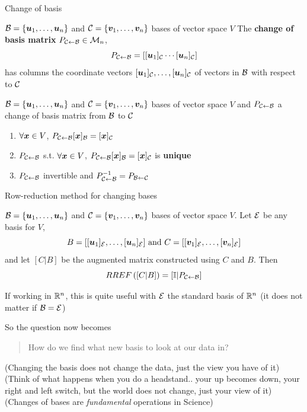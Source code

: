 \documentclass[aspectratio=169]{beamer}\usepackage[]{graphicx}\usepackage[]{xcolor}
\begin{document}
\begin{frame}{Change of basis}
\begin{definition}
$\mathcal{B}=\{\bm{u}_1,\ldots,\bm{u}_n\}$ and $\mathcal{C}=\{\bm{v}_1,\ldots,\bm{v}_n\}$ bases of vector space $V$
\vfill
The \textbf{change of basis matrix} $P_{\mathcal{C}\leftarrow\mathcal{B}}\in\mathcal{M}_n$,
\[
P_{\mathcal{C}\leftarrow\mathcal{B}}
=\left[
[\bm{u}_1]_{\mathcal{C}} \cdots [\bm{u}_n]_{\mathcal{C}}
\right]
\]
has columns the coordinate vectors $[\bm{u}_1]_{\mathcal{C}},\ldots,[\bm{u}_n]_{\mathcal{C}}$ of vectors in $\mathcal{B}$ with respect to $\mathcal{C}$
\end{definition}
\vfill
\begin{theorem}
$\mathcal{B}=\{\bm{u}_1,\ldots,\bm{u}_n\}$ and $\mathcal{C}=\{\bm{v}_1,\ldots,\bm{v}_n\}$ bases of vector space $V$ and $P_{\mathcal{C}\leftarrow\mathcal{B}}$ a change of basis matrix from $\mathcal{B}$ to $\mathcal{C}$
\begin{enumerate}
\item $\forall\bm{x}\in V$, $P_{\mathcal{C}\leftarrow\mathcal{B}}[\bm{x}]_{\mathcal{B}} = [\bm{x}]_{\mathcal{C}}$
\item $P_{\mathcal{C}\leftarrow\mathcal{B}}$ s.t. $\forall\bm{x}\in V$, $P_{\mathcal{C}\leftarrow\mathcal{B}}[\bm{x}]_{\mathcal{B}} = [\bm{x}]_{\mathcal{C}}$ is \textbf{unique}
\item $P_{\mathcal{C}\leftarrow\mathcal{B}}$ invertible and $P_{\mathcal{C}\leftarrow\mathcal{B}}^{-1}=P_{\mathcal{B}\leftarrow\mathcal{C}}$
\end{enumerate}
\end{theorem}
\end{frame}


\begin{frame}{Row-reduction method for changing bases}
\begin{theorem}
\label{th:change-basis-construction}
$\mathcal{B}=\{\bm{u}_1,\ldots,\bm{u}_n\}$ and $\mathcal{C}=\{\bm{v}_1,\ldots,\bm{v}_n\}$ bases of vector space $V$. Let $\mathcal{E}$ be any basis for $V$,
\[
B = [[\bm{u}_1]_{\mathcal{E}},\ldots,[\bm{u}_n]_{\mathcal{E}}] 
\textrm{ and }
C = [[\bm{v}_1]_{\mathcal{E}},\ldots,[\bm{v}_n]_{\mathcal{E}}] 
\]
and let $[C|B]$ be the augmented matrix constructed using $C$ and $B$. Then
\[
RREF\left([C|B]\right)
=[\mathbb{I}|P_{\mathcal{C}\leftarrow\mathcal{B}}]
\]
\end{theorem}
\vfill
If working in $\mathbb{R}^n$, this is quite useful with $\mathcal{E}$ the standard basis of $\mathbb{R}^n$ (it does not matter if $\mathcal{B}=\mathcal{E}$)
\end{frame}

\begin{frame}
So the question now becomes
\begin{quote}
How do we find what new basis to look at our data in?
\end{quote}
\vfill
(Changing the basis does not change the data, just the view you have of it)
\vfill
(Think of what happens when you do a headstand.. your up becomes down, your right and left switch, but the world does not change, just your view of it)
\vfill
(Changes of bases are \emph{fundamental} operations in Science)
\end{frame}
\end{document}
